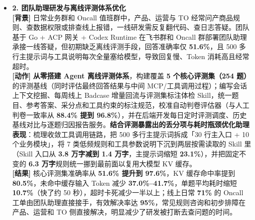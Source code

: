 \documentclass[10pt,letterpaper]{article}
\begin{document}
\begin{itemize}[leftmargin=0pt,label={}]
\begin{itemize}[leftmargin=10pt,label=$\circ$,itemsep=2.5pt,topsep=1.5pt]
    \item \textbf{2. 团队助理研发与离线评测体系优化} \\
    \textbf{[背景]} 日常业务群和 Oncall 值班群中，产品、运营与 TO 经常问产商品规则、查数据权限或排查线上报错，一线研发需反复翻代码、查日志答疑。团队基于 Go + ACP 网关 + Codex Runtime 在飞书群和 Oncall 群部署团队助理承接一线答疑，但初期缺乏离线评测手段，回答准确率仅 \textbf{51.6\%}，且 500 多行主提示词与工具说明每次全量塞给模型，导致回复慢、Token 消耗高且经常超时。 \\
    \textbf{[动作]} \textbf{从零搭建 Agent 离线评测体系}，构建覆盖 \textbf{5 个核心评测集（254 题）}的评测基线（同时评估最终回答结果与中间 MCP/工具调用过程）；编写会话上下文挖掘、每周线上 Badcase 增量回流与评测集标注体检 Skill，统一题目、参考答案、采分点和工具约束的标注规范，校准自动判卷评估器（与人工判卷一致率从 \textbf{88.4\% 提到 96.8\%}），并在后端开发每日定时评测调度、历史基线对比与逐题归因报告服务。\textbf{结合评测暴露出的丢分项与耗时瓶颈优化助理表现}：梳理收敛工具调用链路，把 500 多行主提示词拆成「30 行主入口 + 10 个业务模块」，将 7 类低频规则和工具参数说明下沉到两层按需读取的 Skill 里（Skill 入口从 \textbf{3.8 万字减到 1.4 万字}，主提示词缩短 \textbf{23.1\%}），并把固定不变的 \textbf{6.3 万字}规则统一挪到最前面以复用大模型 KV 缓存。 \\
    \textbf{[结果]} 核心评测集准确率从 \textbf{51.6\% 提升到 97.6\%}，KV 缓存命中率提到 \textbf{80.5\%}，未命中缓存输入 Token 减少 \textbf{37.0\%--41.7\%}，单题平均耗时缩短 \textbf{10.7\%}（快了约 50 秒），超时卡死减少一半以上；线上日常 \textbf{71\%} 的 Oncall 工单由团队助理直接接手，有效解决率达 \textbf{95\%}，常见规则咨询和初步排障在产品、运营和 TO 侧直接解决，明显减少了研发被打断去查问题的时间。
  \end{itemize}


\end{itemize}
\end{document}
